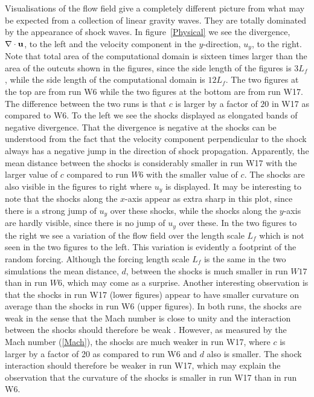 \documentclass{jfm}
\begin{document}
Visualisations of the flow field give a completely different picture from what
may be expected from a collection of linear gravity waves. They are totally
dominated by the appearance of shock waves. In figure~\ref{Physical} we see
the divergence, $ \nabla \cdot {\bf u} $, to the left and the velocity
component in the $ y $-direction, $ u_y $, to the right.  Note that total area of the computational domain is sixteen times larger than the area of the outcuts shown in the figures, since the side length of the figures is $ 3 L_f $, while the side length of the computational domain is $ 12 L_f $.
The two figures at the
top are from run W6 while the two figures at the bottom are from run W17. The
difference between the two runs is that $ c $ is larger by a factor of $ 20 $
in W17 as compared to W6. To the left we see the shocks displayed as elongated
bands of negative divergence. That the divergence is negative at the shocks can
be understood from the fact that the velocity component perpendicular to the
shock always has a negative jump in the direction of shock propagation.
Apparently, the mean distance between the shocks is considerably smaller in run
W17 with the larger value of $ c $ compared to run $ W6 $ with the smaller
value of $ c $. 
The shocks are also visible in the figures to right where $ u_y
$ is displayed. It may be interesting to note that the shocks along the $ x
$-axis appear as extra sharp in this plot, since there is a strong jump of $
u_{y} $ over these shocks, while the shocks along the $ y $-axis are hardly
visible, since there is no jump of $ u_{y} $ over these. In the two figures to
the right we see a variation of the flow field over the length scale $ L_f $
which is not seen in the two figures to the left. This variation is evidently a
footprint of the random forcing. Although the forcing length scale $ L_f $ is
the same in the two simulations the mean distance, $ d $, between the shocks is
much smaller in run $ W17 $ than in run $ W6 $, which may come as a surprise. Another interesting observation is that the shocks in run W17 (lower figures) appear to have smaller curvature on average than the shocks in run W6 (upper figures). In both runs, the shocks are weak in the sense that the Mach number is close to unity and the interaction between the shocks should therefore be weak \cite[see][]{ApazidisEliasson2018}. However, as measured by the Mach number  (\ref{Mach}), the shocks are much weaker in run W17, where $ c $ is larger by a factor of 20 as compared to run W6 and $ d $ also is smaller. The shock interaction should therefore be weaker in run W17, which may explain the observation that the curvature of the shocks is smaller in run W17 than in run W6.
\end{document}
